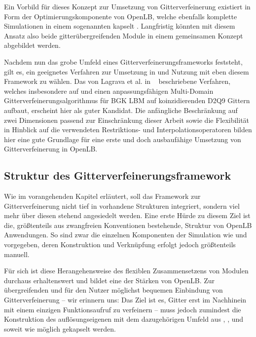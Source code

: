 Ein Vorbild für dieses Konzept zur Umsetzung von Gitterverfeinerung existiert in Form der Optimierungskomponente von OpenLB, welche ebenfalls komplette Simulationen in einem sogenannten  kapselt \cite[vgl.~Abb.~4.1]{Krause10}. Langfristig könnten mit diesem Ansatz also beide gitterübergreifenden Module in einem gemeinsamen Konzept abgebildet werden.

\bigskip
Nachdem nun das grobe Umfeld eines Gitterverfeinerungsframeworks feststeht, gilt es, ein geeignetes Verfahren zur Umsetzung in und Nutzung mit eben diesem Framework zu wählen. Das von Lagrava et al. in ~\cite{Lagrava12} beschriebene Verfahren, welches insbesondere auf \cite{DupuisChopard03} und \cite{Filippova98} einen anpassungsfähigen Multi-Domain Gitterverfeinerungsalgorithmus für BGK LBM auf koinzidierenden D2Q9 Gittern aufbaut, erscheint hier als guter Kandidat. Die anfängliche Beschränkung auf zwei Dimensionen passend zur Einschränkung dieser Arbeit sowie die Flexibilität in Hinblick auf die verwendeten Restriktions- und Interpolationsoperatoren bilden hier eine gute Grundlage für eine erste und doch ausbaufähige Umsetzung von Gitterverfeinerung in OpenLB.

\newpage
\subsection{Struktur des Gitterverfeinerungsframework}

Wie im vorangehenden Kapitel erläutert, soll das Framework zur Gitterverfeinerung nicht tief in vorhandene Strukturen integriert, sondern viel mehr über diesen stehend angesiedelt werden. Eine erste Hürde zu diesem Ziel ist die, größtenteils aus zwangfreien Konventionen bestehende, Struktur von OpenLB Anwendungen. So sind zwar die einzelnen Komponenten der Simulation wie  und  vorgegeben, deren Konstruktion und Verknüpfung erfolgt jedoch größtenteils manuell.

Für sich ist diese Herangehensweise des flexiblen Zusammensetzens von Modulen durchaus erhaltenswert und bildet eine der Stärken von OpenLB. Zur übergreifenden und für den Nutzer möglichst bequemen Einbindung von Gitterverfeinerung -- wir erinnern uns: Das Ziel ist es, Gitter erst im Nachhinein mit einem einzigen Funktionsaufruf zu verfeinern -- muss jedoch zumindest die Konstruktion des auflösungseigenen  mit dem dazugehörigen Umfeld aus , ,  und  soweit wie möglich gekapselt werden.


